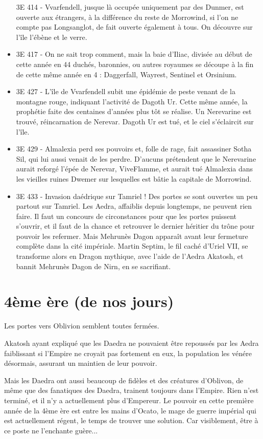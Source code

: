 \begin{itemize}
3E 414 - Vvarfendell, jusque là occupée uniquement par des Dunmer, est ouverte aux étrangers, à la différence du reste de Morrowind, si l'on ne compte pas Longsanglot, de fait ouverte également à tous. On découvre sur l'île l'ébène et le verre.
\item
3E 417 - On ne sait trop comment, mais la baie d'Iliac, divisée au début de cette année en 44 duchés, baronnies, ou autres royaumes se découpe à la fin de cette même année en 4 : Daggerfall, Wayrest, Sentinel et Orsinium.
\item
3E 427 - L'île de Vvarfendell subit une épidémie de peste venant de la montagne rouge, indiquant l'activité de Dagoth Ur. Cette même année, la prophétie faite des centaines d'années plus tôt se réalise. Un Nerevarine est trouvé, réincarnation de Nerevar. Dagoth Ur est tué, et le ciel s'éclaircit sur l'île.
\item
3E 429 - Almalexia perd ses pouvoirs et, folle de rage, fait assassiner Sotha Sil, qui lui aussi venait de les perdre. D'aucuns prétendent que le Nerevarine aurait reforgé l'épée de Nerevar, ViveFlamme, et aurait tué Almalexia dans les vieilles ruines Dwemer sur lesquelles est bâtie la capitale de Morrowind.
\item
3E 433 - Invasion daédrique sur Tamriel ! Des portes se sont ouvertes un peu partout sur Tamriel. Les Aedra, affaiblis depuis longtemps, ne peuvent rien faire. Il faut un concours de circonstances pour que les portes puissent s'ouvrir, et il faut de la chance et retrouver le dernier héritier du trône pour pouvoir les refermer. Mais Mehrunès Dagon apparaît avant leur fermeture complète dans la cité impériale. Martin Septim, le fil caché d'Uriel VII, se transforme alors en Dragon mythique, avec l'aide de l'Aedra Akatosh, et bannit Mehrunès Dagon de Nirn, en se sacrifiant.

\end{itemize}

\section{4ème ère (de nos jours)}

Les portes vers Oblivion semblent toutes fermées.

Akatosh ayant expliqué que les Daedra ne pouvaient être repoussés par les Aedra faiblissant si l'Empire ne croyait pas fortement en eux, la population les vénére désormais, assurant un maintien de leur pouvoir.

Mais les Daedra ont aussi beaucoup de fidèles et des créatures d'Oblivon, de même que des fanatiques des Daedra, trainent toujours dans l'Empire. Rien n'est terminé, et il n'y a actuellement plus d'Empereur. Le pouvoir en cette première année de la 4ème ère est entre les mains d'Ocato, le mage de guerre impérial qui est actuellement régent, le temps de trouver une solution. Car visiblement, être à ce poste ne l'enchante guère...
